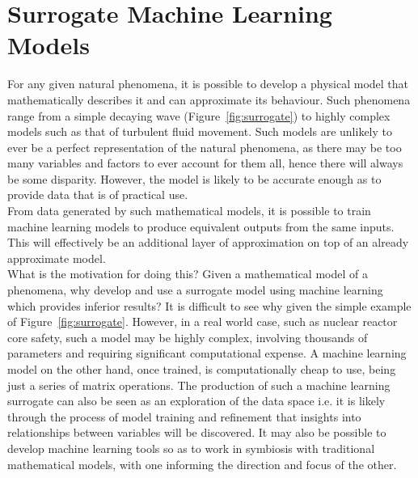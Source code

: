 \section{Surrogate Machine Learning Models} \label{Surrogate}

For any given natural phenomena, it is possible to develop a physical model that mathematically describes it and can approximate its behaviour. Such phenomena range from a simple decaying wave (Figure~\ref{fig:surrogate}) to highly complex models such as that of turbulent fluid movement. Such models are unlikely to ever be a perfect representation of the natural phenomena, as there may be too many variables and factors to ever account for them all, hence there will always be some disparity. However, the model is likely to be accurate enough as to provide data that is of practical use.
\\

\noindent
From  data generated by such mathematical models, it is possible to train machine learning models to produce equivalent outputs from the same inputs. This will effectively be an additional layer of approximation on top of an already approximate model.
\\

\noindent
What is the motivation for doing this? Given a mathematical model of a phenomena, why develop and use a surrogate model using machine learning which provides inferior results? It is difficult to see why given the simple example of Figure~\ref{fig:surrogate}. However, in a real world case, such as nuclear reactor core safety, such a model may be highly complex, involving thousands of parameters and requiring significant computational expense. A machine learning model on the other hand, once trained, is computationally cheap to use, being just a series of matrix operations. The production of such a machine learning surrogate can also be seen as an exploration of the data space i.e. it is likely through the process of model training and refinement that insights into relationships between variables will be discovered. It may also be possible to develop machine learning tools so as to work in symbiosis with traditional mathematical models, with one informing the direction and focus of the other.



